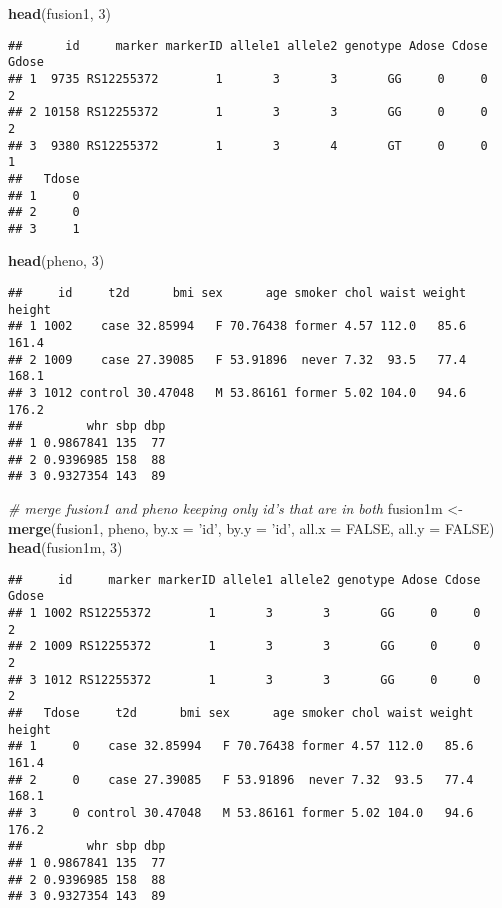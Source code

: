 \documentclass[]{book}
\newenvironment{Shaded}{\begin{snugshade}}{\end{snugshade}}
\newcommand{\CommentTok}[1]{\textcolor[rgb]{0.56,0.35,0.01}{\textit{#1}}}
\newcommand{\DataTypeTok}[1]{\textcolor[rgb]{0.13,0.29,0.53}{#1}}
\newcommand{\DecValTok}[1]{\textcolor[rgb]{0.00,0.00,0.81}{#1}}
\newcommand{\KeywordTok}[1]{\textcolor[rgb]{0.13,0.29,0.53}{\textbf{#1}}}
\newcommand{\NormalTok}[1]{#1}
\newcommand{\OtherTok}[1]{\textcolor[rgb]{0.56,0.35,0.01}{#1}}
\newcommand{\StringTok}[1]{\textcolor[rgb]{0.31,0.60,0.02}{#1}}
\begin{document}
\begin{Shaded}
\begin{Highlighting}[]
\KeywordTok{head}\NormalTok{(fusion1, }\DecValTok{3}\NormalTok{)}
\end{Highlighting}
\end{Shaded}

\begin{verbatim}
##      id     marker markerID allele1 allele2 genotype Adose Cdose Gdose
## 1  9735 RS12255372        1       3       3       GG     0     0     2
## 2 10158 RS12255372        1       3       3       GG     0     0     2
## 3  9380 RS12255372        1       3       4       GT     0     0     1
##   Tdose
## 1     0
## 2     0
## 3     1
\end{verbatim}

\begin{Shaded}
\begin{Highlighting}[]
\KeywordTok{head}\NormalTok{(pheno, }\DecValTok{3}\NormalTok{)}
\end{Highlighting}
\end{Shaded}

\begin{verbatim}
##     id     t2d      bmi sex      age smoker chol waist weight height
## 1 1002    case 32.85994   F 70.76438 former 4.57 112.0   85.6  161.4
## 2 1009    case 27.39085   F 53.91896  never 7.32  93.5   77.4  168.1
## 3 1012 control 30.47048   M 53.86161 former 5.02 104.0   94.6  176.2
##         whr sbp dbp
## 1 0.9867841 135  77
## 2 0.9396985 158  88
## 3 0.9327354 143  89
\end{verbatim}

\begin{Shaded}
\begin{Highlighting}[]
\CommentTok{# merge fusion1 and pheno keeping only id's that are in both}
\NormalTok{fusion1m <-}\StringTok{ }\KeywordTok{merge}\NormalTok{(fusion1, pheno, }\DataTypeTok{by.x =} \StringTok{'id'}\NormalTok{, }\DataTypeTok{by.y =} \StringTok{'id'}\NormalTok{, }\DataTypeTok{all.x =} \OtherTok{FALSE}\NormalTok{, }\DataTypeTok{all.y =} \OtherTok{FALSE}\NormalTok{)}
\KeywordTok{head}\NormalTok{(fusion1m, }\DecValTok{3}\NormalTok{)}
\end{Highlighting}
\end{Shaded}

\begin{verbatim}
##     id     marker markerID allele1 allele2 genotype Adose Cdose Gdose
## 1 1002 RS12255372        1       3       3       GG     0     0     2
## 2 1009 RS12255372        1       3       3       GG     0     0     2
## 3 1012 RS12255372        1       3       3       GG     0     0     2
##   Tdose     t2d      bmi sex      age smoker chol waist weight height
## 1     0    case 32.85994   F 70.76438 former 4.57 112.0   85.6  161.4
## 2     0    case 27.39085   F 53.91896  never 7.32  93.5   77.4  168.1
## 3     0 control 30.47048   M 53.86161 former 5.02 104.0   94.6  176.2
##         whr sbp dbp
## 1 0.9867841 135  77
## 2 0.9396985 158  88
## 3 0.9327354 143  89
\end{verbatim}
\end{document}
